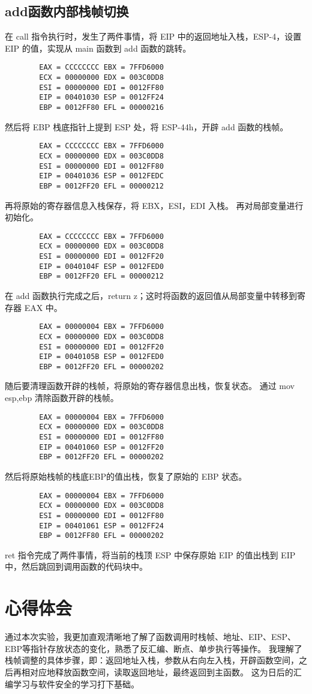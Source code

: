 \documentclass{ctexart}
\begin{document}
    \subsection{add函数内部栈帧切换}
    在 call 指令执行时，发生了两件事情，将 EIP 中的返回地址入栈，ESP-4，设置
    EIP 的值，实现从 main 函数到 add 函数的跳转。
    \begin{lstlisting}
        EAX = CCCCCCCC EBX = 7FFD6000
        ECX = 00000000 EDX = 003C0DD8
        ESI = 00000000 EDI = 0012FF80
        EIP = 00401030 ESP = 0012FF24
        EBP = 0012FF80 EFL = 00000216 
    \end{lstlisting}
    然后将 EBP 栈底指针上提到 ESP 处，将 ESP-44h，开辟 add 函数的栈帧。
    \begin{lstlisting}
        EAX = CCCCCCCC EBX = 7FFD6000
        ECX = 00000000 EDX = 003C0DD8
        ESI = 00000000 EDI = 0012FF80
        EIP = 00401036 ESP = 0012FEDC
        EBP = 0012FF20 EFL = 00000212         
    \end{lstlisting}
    再将原始的寄存器信息入栈保存，将 EBX，ESI，EDI 入栈。
    再对局部变量进行初始化。
    \begin{lstlisting}
        EAX = CCCCCCCC EBX = 7FFD6000
        ECX = 00000000 EDX = 003C0DD8
        ESI = 00000000 EDI = 0012FF20
        EIP = 0040104F ESP = 0012FED0
        EBP = 0012FF20 EFL = 00000212        
    \end{lstlisting}
    在 add 函数执行完成之后，return z；这时将函数的返回值从局部变量中转移到寄存器
    EAX 中。
    \begin{lstlisting}
        EAX = 00000004 EBX = 7FFD6000
        ECX = 00000000 EDX = 003C0DD8
        ESI = 00000000 EDI = 0012FF20
        EIP = 0040105B ESP = 0012FED0
        EBP = 0012FF20 EFL = 00000202       
    \end{lstlisting}
    随后要清理函数开辟的栈帧，将原始的寄存器信息出栈，恢复状态。
    通过 mov esp,ebp 清除函数开辟的栈帧。
    \begin{lstlisting}
        EAX = 00000004 EBX = 7FFD6000
        ECX = 00000000 EDX = 003C0DD8
        ESI = 00000000 EDI = 0012FF80
        EIP = 00401060 ESP = 0012FF20
        EBP = 0012FF20 EFL = 00000202        
    \end{lstlisting}
    然后将原始栈帧的栈底EBP的值出栈，恢复了原始的 EBP 状态。
    \begin{lstlisting}
        EAX = 00000004 EBX = 7FFD6000
        ECX = 00000000 EDX = 003C0DD8
        ESI = 00000000 EDI = 0012FF80
        EIP = 00401061 ESP = 0012FF24
        EBP = 0012FF80 EFL = 00000202        
    \end{lstlisting}
    ret 指令完成了两件事情，将当前的栈顶 ESP 中保存原始 EIP 的值出栈到 EIP 中，然后跳回到调用函数的代码块中。
    \section{心得体会}
    通过本次实验，我更加直观清晰地了解了函数调用时栈帧、地址、EIP、ESP、EBP等指针存放状态的变化，熟悉了反汇编、断点、单步执行等操作。
    我理解了栈帧调整的具体步骤，即：返回地址入栈，参数从右向左入栈，开辟函数空间，之后再相对应地释放函数空间，读取返回地址，最终返回到主函数。
    这为日后的汇编学习与软件安全的学习打下基础。
\end{document}
